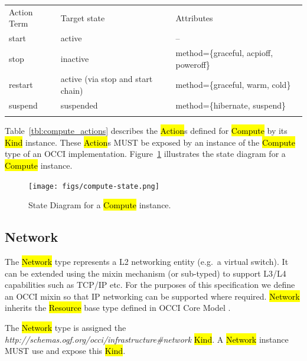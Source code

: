 \documentclass[10pt,a4paper]{article}
\begin{document}
{
	\begin{tabular}{lll}
	\toprule
	Action Term & Target state & Attributes \\
	\colrule
	start & active & -- \\
	stop & inactive & method=\{graceful, acpioff, poweroff\} \\
	restart & active (via stop and start chain) & method=\{graceful, warm, cold\} \\
	suspend & suspended & method=\{hibernate, suspend\} \\
	\botrule
	\end{tabular}
}

Table~\ref{tbl:compute_actions} describes the \hl{Action}s defined for
\hl{Compute} by its \hl{Kind} instance. These \hl{Action}s MUST be
exposed by an instance of the \hl{Compute} type of an OCCI
implementation.  Figure~\ref{fig:compute_state} illustrates the state
diagram for a \hl{Compute} instance.

\begin{figure}[!h]
	\centering
	\texttt{[image: figs/compute-state.png]}
	\caption{State Diagram for a \hl{Compute} instance.}
	\label{fig:compute_state}
\end{figure}

\subsection{Network}
The \hl{Network} type represents a L2 networking entity (e.g.~a
virtual switch). It can be extended using the mixin mechanism (or
sub-typed) to support L3/L4 capabilities such as TCP/IP etc.  For the
purposes of this specification we define an OCCI mixin so that IP
networking can be supported where required. \hl{Network} inherits the
\hl{Resource} base type defined in OCCI Core Model \cite{occi:core}.

The \hl{Network} type is assigned the
\textit{http://schemas.ogf.org/occi/infrastructure\#network}
\hl{Kind}. A \hl{Network} instance MUST use and expose this \hl{Kind}.
\end{document}

